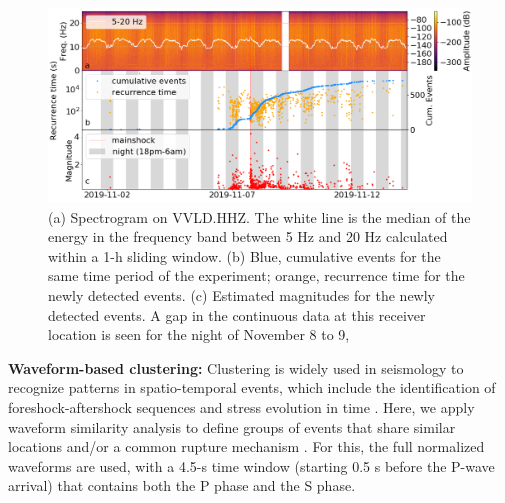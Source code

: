 \documentclass[a4paper,12pt,twoside]{article}
\begin{document}
\begin{figure}
    \centering
     \includegraphics[width=1\linewidth]{spec_rec_mag.png}    
\caption{(a) Spectrogram on VVLD.HHZ. The white line is the median of the energy in the frequency band between 5 Hz and 20 Hz calculated within a 1-h sliding window. \protect{} (b) Blue, cumulative events for the same time period of the experiment; orange, recurrence time for the newly detected events. (c) Estimated magnitudes for the newly detected events. A gap in the continuous data at this receiver location is seen for the night of November 8 to 9, \protect{} \protect{}}
\end{figure}    \label{fig:spectrum}


{\bf Waveform-based clustering:} Clustering is widely used in seismology to recognize patterns in spatio-temporal events, which include the identification of foreshock-aftershock sequences and stress evolution in time \citep[\emph{e.g.},][]{Kagan_1991_LTE, wehling_2013_IDT, Cesca_2014_SMC, Ellsworth_2018_NIE}. Here, we apply waveform similarity analysis \citep{Cattaneo_1999_WSA} to define groups of events that share similar locations and/or a common rupture mechanism \citep{Kagan_1991_LTE, wehling_2013_IDT, Cesca_2014_SMC, Ellsworth_2018_NIE, Cattaneo_1999_WSA}. For this, the full normalized waveforms are used, with a 4.5-s time window (starting 0.5 s before the P-wave arrival) that contains both the P phase and the S phase. 
\end{document}
